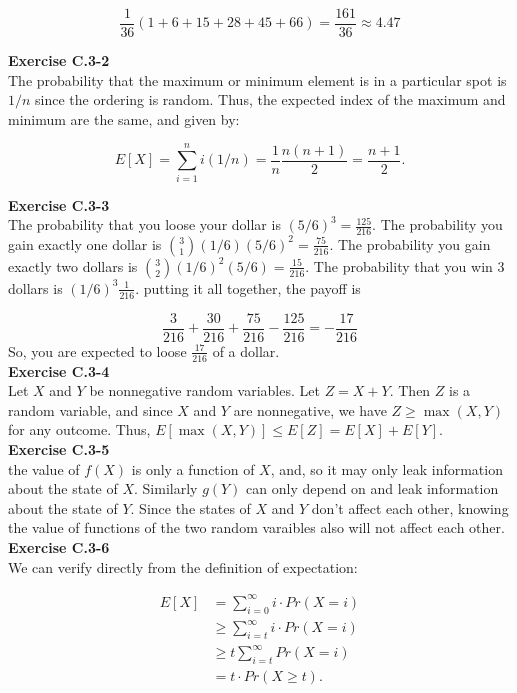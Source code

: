 \documentclass{article}
\begin{document}
\[
\frac{1}{36}( 1 + 6 + 15 + 28 + 45 + 66) = \frac{161}{36} \approx 4.47
\]

\noindent\textbf{Exercise C.3-2}\\

The probability that the maximum or minimum element is in a particular spot is $1/n$ since the ordering is random.  Thus, the expected index of the maximum and minimum are the same, and given by:

\[ E[X] = \sum_{i=1}^n i(1/n) = \frac{1}{n} \frac{n(n+1)}{2} = \frac{n+1}{2}.\]

\noindent\textbf{Exercise C.3-3}\\

The probability that you loose your dollar is $(5/6)^3 =\frac{125}{216}$. The probability you gain exactly one dollar is $\binom{3}{1} (1/6)(5/6)^2 = \frac{75}{216}$. The probability you gain exactly two dollars is $\binom{3}{2} (1/6)^2 (5/6) = \frac{15}{216}$. The probability that you win 3 dollars is $(1/6)^3\frac{1}{216}$. putting it all together, the payoff is

 \[
 \frac{3}{216} + \frac{30}{216} + \frac{75}{216} - \frac{125}{216} = -\frac{17}{216}
  \] 
  So, you are expected to loose $\frac{17}{216}$ of a dollar.\\


\noindent\textbf{Exercise C.3-4}\\

Let $X$ and $Y$ be nonnegative random variables.  Let $Z = X+Y$.  Then $Z$ is a random variable, and since $X$ and $Y$ are nonnegative, we have $Z \geq \max(X,Y)$ for any outcome.  Thus, $E[\max(X,Y)] \leq E[Z] = E[X] + E[Y]$.\\


\noindent\textbf{Exercise C.3-5}\\

the value of $f(X)$ is only a function of $X$, and, so it may only leak information about the state of $X$. Similarly $g(Y)$ can only depend on and leak information about the state of $Y$. Since the states of $X$ and $Y$ don't affect each other, knowing the value of functions of the two random varaibles also will not affect each other.\\



\noindent\textbf{Exercise C.3-6}\\

We can verify directly from the definition of expectation:

\begin{align*}
E[X] &= \sum_{i=0}^\infty i \cdot Pr(X = i) \\
& \geq \sum_{i=t}^\infty i \cdot Pr(X=i) \\
&\geq t\sum_{i=t}^\infty Pr(X=i) \\
&= t\cdot Pr(X \geq t).
\end{align*}
\end{document}
